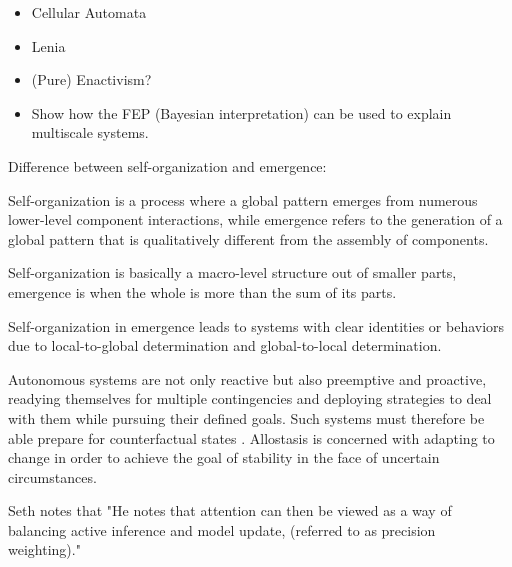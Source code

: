 \begin{itemize}
    \item Cellular Automata
    \item Lenia
    \item (Pure) Enactivism?
    \item Show how the FEP (Bayesian interpretation) can be used to explain multiscale systems.
\end{itemize}


Difference between self-organization and emergence:

Self-organization is a process where a global pattern emerges from numerous lower-level component interactions, while emergence refers to the generation of a global pattern that is qualitatively different from the assembly of components.

Self-organization is basically a macro-level structure out of smaller parts, emergence is when the whole is more than the sum of its parts.

Self-organization in emergence leads to systems with clear identities or behaviors due to local-to-global determination and global-to-local determination.


Autonomous systems are not only reactive but also preemptive and proactive, readying themselves for multiple contingencies and deploying strategies to deal with them while pursuing their defined goals. 
Such systems must therefore be able prepare for counterfactual states . 
Allostasis is concerned with adapting to change in order to achieve the goal of stability in the face of uncertain circumstances. 

Seth notes that "He notes that attention can then be viewed as a way of balancing active inference and model update, (referred to as precision weighting)."






























